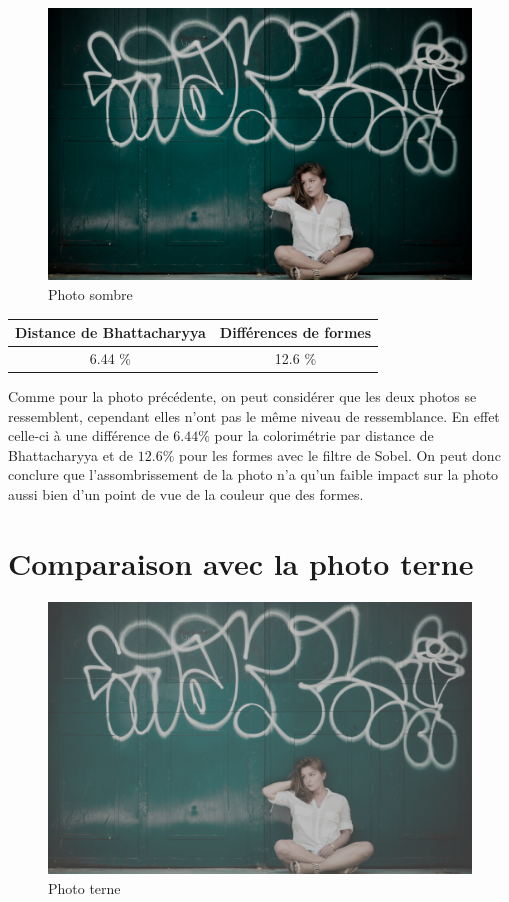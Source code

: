 \documentclass[]{article}
\begin{document}
\begin{description}
\begin{figure}[htbp]
\centering
\includegraphics{photos/sombre.jpg}
\caption{Photo sombre}
\end{figure}

\begin{center}
\begin{tabular}{|c|c|}
  \hline
  Distance de Bhattacharyya & Différences de formes \\
  \hline
  6.44 \% & 12.6 \% \\
  \hline
\end{tabular}
\end{center}

Comme pour la photo précédente, on peut considérer que les deux photos
se ressemblent, cependant elles n'ont pas le même niveau de
ressemblance. En effet celle-ci à une différence de $6.44 \%$ pour la
colorimétrie par distance de Bhattacharyya et de $12.6 \%$ pour les
formes avec le filtre de Sobel. On peut donc conclure que
l'assombrissement de la photo n'a qu'un faible impact sur la photo aussi
bien d'un point de vue de la couleur que des formes.

\newpage

\section{Comparaison avec la photo
terne}\label{comparaison-avec-la-photo-terne}

\begin{figure}[htbp]
\centering
\includegraphics{photos/terne.jpg}
\caption{Photo terne}
\end{figure}


\end{description}
\end{document}
